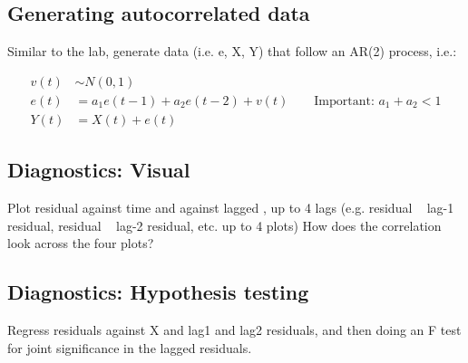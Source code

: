 \documentclass{article}\usepackage[]{graphicx}\usepackage[]{color}
\begin{document}
\subsection{Generating autocorrelated data}

Similar to the lab, generate data (i.e. e, X, Y) that follow an AR(2) process, i.e.:

\begin{align}
v(t) &\sim N(0, 1) \\
e(t) &= a_1e(t-1) + a_2 e(t-2) + v(t) \qquad \text{Important: $a_1 + a_2 < 1$} \\
Y(t) &= X(t) + e(t)
\end{align}

\subsection{Diagnostics: Visual}

Plot residual against time and against lagged , up to 4 lags (e.g. residual ~ lag-1 residual, residual ~ lag-2 residual, etc. up to 4 plots) How does the correlation look across the four plots?

\subsection{Diagnostics: Hypothesis testing}

Regress residuals against X and lag1 and lag2 residuals, and then doing an F test for joint significance in the lagged residuals.
\end{document}
